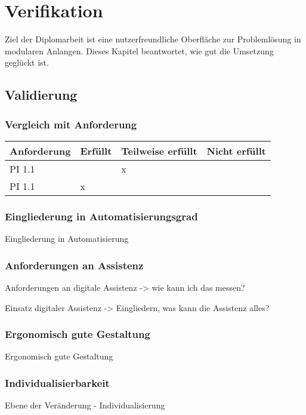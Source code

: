 \chapter{Verifikation}
\label{Verifikation}

Ziel der Diplomarbeit ist eine nutzerfreundliche Oberfläche zur Problemlösung in modularen Anlangen. Dieses Kapitel beantwortet, wie gut die Umsetzung geglückt ist.

\section{Validierung}
\subsection*{Vergleich mit Anforderung}
\begin{table}[htbp]
\centering
\begin{tabular}{l|l|l|l}
Anforderung & Erfüllt & Teilweise erfüllt & Nicht erfüllt \\
\hline
PI 1.1 & & x & \\
\hline
PI 1.1 & x & & \\
\hline

\end{tabular}
\end{table}

\subsection*{Eingliederung in Automatisierungsgrad}
Eingliederung in Automatisierung

\subsection*{Anforderungen an Assistenz}
Anforderungen an digitale Assistenz -> wie kann ich das messen?

Einsatz digitaler Assistenz -> Eingliedern, was kann die Assistenz alles?

\subsection*{Ergonomisch gute Gestaltung}
Ergonomisch gute Gestaltung

\subsection*{Individualisierbarkeit}
Ebene der Veränderung - Individualisierung


